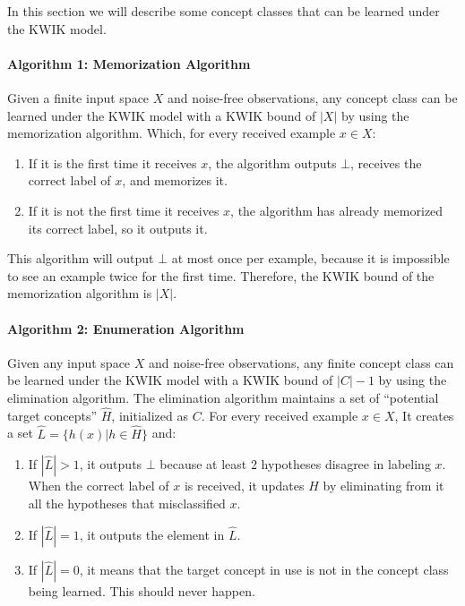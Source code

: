 In this section we will describe some concept classes that can be learned under
the KWIK model.

\paragraph{Algorithm 1: Memorization Algorithm}
Given a finite input space $X$ and noise-free observations, any concept class
can be learned under the KWIK model with a KWIK bound of $|X|$ by using the
memorization algorithm. Which, for every received example $x \in X$:
\begin{enumerate}
  \item If it is the first time it receives $x$, the algorithm outputs $\bot$,
  receives the correct label of $x$, and memorizes it.
  \item If it is not the first time it receives $x$, the algorithm has already
  memorized its correct label, so it outputs it.
\end{enumerate}

This algorithm will output $\bot$ at most once per example, because it is
impossible to see an example twice for the first time. Therefore, the KWIK bound
of the memorization algorithm is $|X|$. \\

\paragraph{Algorithm 2: Enumeration Algorithm}
Given any input space $X$ and noise-free observations, any finite concept class
can be learned under the KWIK model with a KWIK bound of $|C| - 1$ by using the
elimination algorithm. The elimination algorithm maintains a set of ``potential
target concepts'' $\hat{H}$, initialized as $C$. For every received example
$x \in X$, It creates a set $\hat{L} = \{ h(x) | h \in \hat{H} \}$ and:
\begin{enumerate}
  \item If $|\hat{L}| > 1$, it outputs $\bot$ because at least 2 hypotheses
  disagree in labeling $x$. When the correct label of $x$ is received, it
  updates $\hat{H}$ by eliminating from it all the hypotheses that
  misclassified $x$.
  \item If $|\hat{L}| = 1$, it outputs the element in $\hat{L}$.
  \item If $|\hat{L}| = 0$, it means that the target concept in use is not in
  the concept class being learned. This should never happen.
\end{enumerate}

